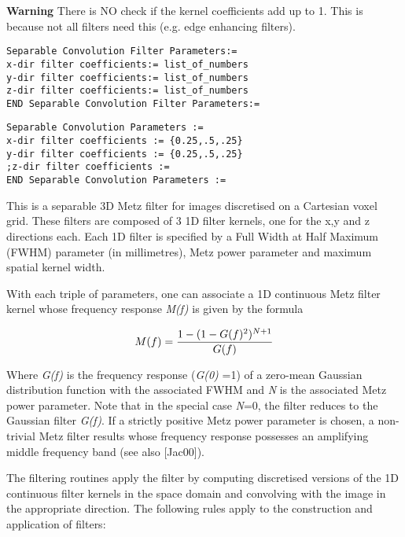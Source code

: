\documentclass{article}
\begin{document}
\textbf{Warning} There is NO check if the kernel coefficients add 
up to 1. This is because not all filters need this (e.g. edge 
enhancing filters).

{ 
}
\begin{verbatim}
Separable Convolution Filter Parameters:=
x-dir filter coefficients:= list_of_numbers
y-dir filter coefficients:= list_of_numbers
z-dir filter coefficients:= list_of_numbers
END Separable Convolution Filter Parameters:=
\end{verbatim}

{ 
}
\begin{verbatim}
Separable Convolution Parameters := 
x-dir filter coefficients := {0.25,.5,.25} 
y-dir filter coefficients := {0.25,.5,.25} 
;z-dir filter coefficients :=
END Separable Convolution Parameters :=
\end{verbatim}

{ 
}

This is a separable 3D Metz filter for images discretised on 
a Cartesian voxel grid. These filters are composed of 3 1D filter 
kernels, one for the x,y and z directions each. Each 1D filter 
is specified by a Full Width at Half Maximum (FWHM) parameter 
(in millimetres), Metz power parameter and maximum spatial kernel 
width. 



With each triple of parameters, one can associate a 1D continuous 
Metz filter kernel whose frequency response \textit{M(f)} is given 
by the formula

\[
M(f)=
{1-(1-G(f)^2)^{N+1}
\over
G(f)
}
\]

Where \textit{G(f)} is the frequency response (\textit{G(0)} =1) of a zero-mean 
Gaussian distribution function with the associated FWHM and \textit{N} 
is the associated Metz power parameter. Note that in the special 
case \textit{N}=0, the filter reduces to the Gaussian filter \textit{G(f)}. 
If a strictly positive Metz power parameter is chosen, a non-trivial 
Metz filter results whose frequency response possesses an amplifying 
middle frequency band (see also [Jac00]).



The filtering routines apply the filter by computing discretised 
versions of the 1D continuous filter kernels in the space domain 
and convolving with the image in the appropriate direction. The 
following rules apply to the construction and application of 
filters:
\end{document}
